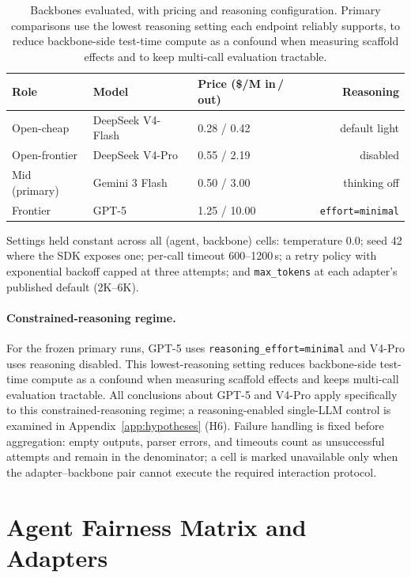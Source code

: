 \documentclass[letterpaper]{article} %
\begin{document}
\begin{table}[h]
\centering
\scriptsize
\setlength{\tabcolsep}{3.0pt}
\caption{Backbones evaluated, with pricing and reasoning configuration. Primary
comparisons use the lowest reasoning setting each endpoint reliably supports, to
reduce backbone-side test-time compute as a confound when measuring scaffold
effects and to keep multi-call evaluation tractable.}
\label{tab:backbones}
\begin{tabular}{@{}lllr@{}}
\toprule
Role & Model & Price (\$/M in\,/\,out) & Reasoning \\
\midrule
Open-cheap & DeepSeek V4-Flash & 0.28 / 0.42 & default light \\
Open-frontier & DeepSeek V4-Pro & 0.55 / 2.19 & disabled \\
Mid (primary) & Gemini 3 Flash & 0.50 / 3.00 & thinking off \\
Frontier & GPT-5 & 1.25 / 10.00 & \texttt{effort=minimal} \\
\bottomrule
\end{tabular}
\end{table}

Settings held constant across all (agent, backbone) cells: temperature 0.0;
seed 42 where the SDK exposes one; per-call timeout 600--1200\,s; a
retry policy with exponential backoff capped at three attempts; and
\texttt{max\_tokens} at each adapter's published default (2K--6K).

\paragraph{Constrained-reasoning regime.}
For the frozen primary runs, GPT-5 uses \texttt{reasoning\_effort=minimal} and
V4-Pro uses reasoning disabled. This lowest-reasoning setting reduces
backbone-side test-time compute as a confound when measuring scaffold effects
and keeps multi-call evaluation tractable. All conclusions about GPT-5 and
V4-Pro apply specifically to this constrained-reasoning regime; a
reasoning-enabled single-LLM control is examined in
Appendix~\ref{app:hypotheses} (H6). Failure handling is fixed before
aggregation: empty outputs, parser errors, and timeouts count as unsuccessful
attempts and remain in the denominator; a cell is marked unavailable only when
the adapter--backbone pair cannot execute the required interaction protocol.

\section{Agent Fairness Matrix and Adapters}
\label{app:fairness}
\end{document}
